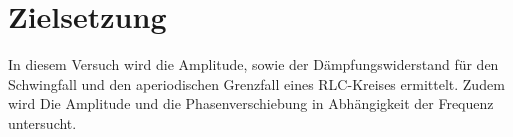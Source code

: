 \section{Zielsetzung}
\label{sec:Zielsetzung}

In diesem Versuch wird die Amplitude, sowie der Dämpfungswiderstand für den Schwingfall und den
aperiodischen Grenzfall eines RLC-Kreises ermittelt. Zudem wird Die Amplitude und die Phasenverschiebung in Abhängigkeit der
Frequenz untersucht.
